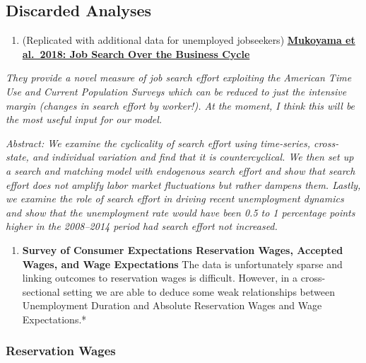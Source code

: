 
\subsection{Discarded Analyses}\label{discarded-analyses}

\begin{enumerate}
\def\labelenumi{\arabic{enumi}.}
\tightlist
\item
  (Replicated with additional data for unemployed jobseekers)
  \href{https://www.aeaweb.org/articles?id=10.1257/mac.20160202}{\textbf{Mukoyama
  et al.~2018: Job Search Over the Business Cycle}}
\end{enumerate}

\emph{They provide a novel measure of job search effort exploiting the
American Time Use and Current Population Surveys which can be reduced to
just the intensive margin (changes in search effort by worker!). At the
moment, I think this will be the most useful input for our model.}

\emph{Abstract: We examine the cyclicality of search effort using
time-series, cross-state, and individual variation and find that it is
countercyclical. We then set up a search and matching model with
endogenous search effort and show that search effort does not amplify
labor market fluctuations but rather dampens them. Lastly, we examine
the role of search effort in driving recent unemployment dynamics and
show that the unemployment rate would have been 0.5 to 1 percentage
points higher in the 2008--2014 period had search effort not increased.}

\begin{enumerate}
\def\labelenumi{\arabic{enumi}.}
\setcounter{enumi}{3}
\tightlist
\item
  \textbf{Survey of Consumer Expectations Reservation Wages, Accepted
  Wages, and Wage Expectations} The data is unfortunately sparse and
  linking outcomes to reservation wages is difficult. However, in a
  cross-sectional setting we are able to deduce some weak relationships
  between Unemployment Duration and Absolute Reservation Wages and Wage
  Expectations.*
\end{enumerate}

\subsubsection{Reservation Wages}\label{reservation-wages}

